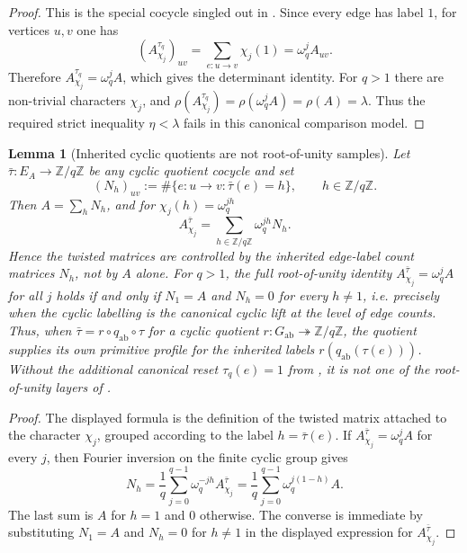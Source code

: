 \documentclass[11pt,a4paper]{amsart}
\theoremstyle{plain}
\newtheorem{lemma}[theorem]{Lemma}
\theoremstyle{definition}
\theoremstyle{remark}
\newcommand{\ZZ}{\mathbb{Z}}
\begin{document}
\begin{proof}
  This is the special cocycle singled out in
  . Since every edge has label \(1\),
  for vertices \(u,v\) one has
  \[
    (A_{\chi_j}^{\tau_q})_{uv}
    =
    \sum_{e:u\to v}\chi_j(1)
    =
    \omega_q^j A_{uv}.
  \]
  Therefore \(A_{\chi_j}^{\tau_q}=\omega_q^jA\), which gives the
  determinant identity. For \(q>1\) there are non-trivial characters
  \(\chi_j\), and
  \(\rho(A_{\chi_j}^{\tau_q})=\rho(\omega_q^jA)=\rho(A)=\lambda\).
  Thus the required strict inequality \(\eta<\lambda\) fails in this
  canonical comparison model.
\end{proof}

\begin{lemma}[Inherited cyclic quotients are not root-of-unity samples]
  \label{lem:cyclic-quotient-versus-root-layer}
  Let \(\bar\tau:E_A\to\ZZ/q\ZZ\) be any cyclic quotient cocycle and set
  \[
    (N_h)_{uv}:=\#\{e:u\to v:\bar\tau(e)=h\},
    \qquad h\in\ZZ/q\ZZ.
  \]
  Then \(A=\sum_hN_h\), and for \(\chi_j(h)=\omega_q^{jh}\)
  \[
    A_{\chi_j}^{\bar\tau}
    =
    \sum_{h\in\ZZ/q\ZZ}\omega_q^{jh}N_h.
  \]
  Hence the twisted matrices are controlled by the inherited edge-label
  count matrices \(N_h\), not by \(A\) alone. For \(q>1\), the full
  root-of-unity identity
  \(A_{\chi_j}^{\bar\tau}=\omega_q^jA\) for all \(j\) holds if and only
  if \(N_1=A\) and \(N_h=0\) for every \(h\neq1\), i.e. precisely when
  the cyclic labelling is the canonical cyclic lift at the level of edge
  counts. Thus, when
  \(\bar\tau=r\circ q_{\mathrm{ab}}\circ\tau\) for a cyclic quotient
  \(r:G_{\mathrm{ab}}\twoheadrightarrow\ZZ/q\ZZ\), the quotient supplies
  its own primitive profile for the inherited labels
  \(r(q_{\mathrm{ab}}(\tau(e)))\). Without the additional canonical
  reset \(\tau_q(e)=1\) from , it is
  not one of the root-of-unity layers of .
\end{lemma}

\begin{proof}
  The displayed formula is the definition of the twisted matrix attached
  to the character \(\chi_j\), grouped according to the label
  \(h=\bar\tau(e)\). If \(A_{\chi_j}^{\bar\tau}=\omega_q^jA\) for every
  \(j\), then Fourier inversion on the finite cyclic group gives
  \[
    N_h=\frac1q\sum_{j=0}^{q-1}\omega_q^{-jh}A_{\chi_j}^{\bar\tau}
    =
    \frac1q\sum_{j=0}^{q-1}\omega_q^{j(1-h)}A.
  \]
  The last sum is \(A\) for \(h=1\) and \(0\) otherwise. The converse is
  immediate by substituting \(N_1=A\) and \(N_h=0\) for \(h\neq1\) in the
  displayed expression for \(A_{\chi_j}^{\bar\tau}\).
\end{proof}
\end{document}
